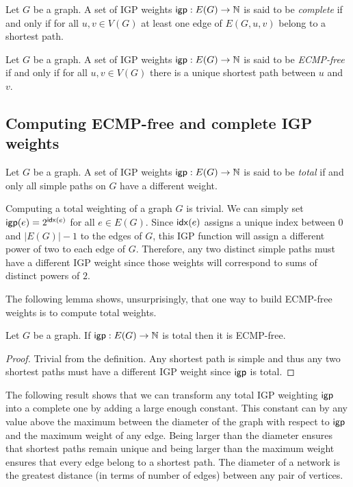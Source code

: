 \begin{definition}
Let $G$ be a graph. A set of IGP weights $\mathsf{igp} : E(G) \rightarrow \mathbb{N}$ is said to be
\emph{complete} if and only if for all $u, v \in V(G)$ at least one edge of $E(G, u, v)$ belong to a shortest path.
\end{definition}

\begin{definition}
Let $G$ be a graph. A set of IGP weights $\mathsf{igp} : E(G) \rightarrow \mathbb{N}$ is said to be
\emph{ECMP-free} if and only if for all $u, v \in V(G)$ there is a unique shortest path between $u$ and $v$.
\end{definition}

\subsection{Computing ECMP-free and complete IGP weights}

\begin{definition}
Let $G$ be a graph. A set of IGP weights $\mathsf{igp} : E(G) \rightarrow \mathbb{N}$ is said to be
\emph{total} if and only all simple paths on $G$ have a different weight.
\end{definition}

Computing a total weighting of a graph $G$ is trivial. We can simply set $\mathsf{igp}(e) = 2^{\mathsf{idx}(e)}$ for
all $e \in E(G)$. Since $\mathsf{idx}(e)$ assigns a unique index between $0$ and $|E(G)| - 1$ to the edges
of $G$, this IGP function will assign a different power of two to each edge of $G$. Therefore,
any two distinct simple paths must have a different IGP weight since those weights will
correspond to sums of distinct powers of $2$.

The following lemma shows, unsurprisingly, that one way to build ECMP-free weights is to compute
total weights.

\begin{lemma}
\label{lemma:totalToECMP}
Let $G$ be a graph. If $\mathsf{igp} : E(G) \rightarrow \mathbb{N}$ is total then it is ECMP-free.
\end{lemma}

\begin{proof}
Trivial from the definition. Any shortest path is simple and thus any two shortest paths must 
have a different IGP weight since $\mathsf{igp}$ is total.
\end{proof}

The following result shows that we can transform any total IGP weighting $\mathsf{igp}$ into a complete one by
adding a large enough constant. This constant can by any value above the maximum between the diameter of the
graph with respect to $\mathsf{igp}$ and the maximum weight of any edge. Being larger than the diameter ensures
that shortest paths remain unique and being larger than the maximum weight ensures that every edge belong to a shortest path. 
The diameter of a network is the greatest distance (in terms of number of edges)
between any pair of vertices.

